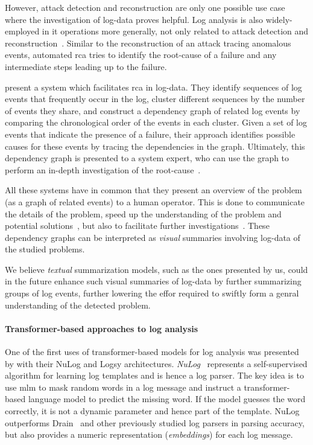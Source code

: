 However, attack detection and reconstruction are only one possible use case where the investigation of log-data proves helpful.
Log analysis is also widely-employed in \ac{it} operations more generally,
not only related to attack detection and reconstruction~\parencite{log_analysis}.
Similar to the reconstruction of an attack tracing anomalous events,
automated \ac{rca} tries to identify the root-cause of a failure and any intermediate steps leading up to the failure.

\citeauthor*{fes_cluster_logs} present a system which facilitates \ac{rca} in log-data.
They identify sequences of log events that frequently occur in the log,
cluster different sequences by the number of events they share,
and construct a dependency graph of related log events
by comparing the chronological order of the events in each cluster.
Given a set of log events that indicate the presence of a failure,
their approach identifies possible causes for these events by tracing the dependencies in the graph.
Ultimately, this dependency graph is presented to a system expert,
who can use the graph to perform an in-depth investigation of the root-cause~\parencite{fes_cluster_logs}.

All these systems have in common that they present an overview of the problem
(as a graph of related events) to a human operator.
This is done to communicate the details of the problem, speed up the understanding of the problem and potential solutions~\parencites{holmes}{hercule},
but also to facilitate further investigations~\parencite{fes_cluster_logs}.
These dependency graphs can be interpreted as \emph{visual} summaries involving log-data of the studied problems.

We believe \emph{textual} summarization models, such as the ones presented by us,
could in the future enhance such visual summaries of log-data by further summarizing groups of log events,
further lowering the effor required to swiftly form a genral understanding of the detected problem.

\paragraph{Transformer-based approaches to log analysis}

One of the first uses of transformer-based models for log analysis was presented by
\citeauthor{logsy} with their NuLog and Logsy architectures.
\emph{NuLog}~\parencite{nulog} represents a self-supervised algorithm for learning log templates and is hence a log parser.
The key idea is to use \ac{mlm} to mask random words in a log message and
instruct a transformer-based language model to predict the missing word.
If the model guesses the word correctly, it is not a dynamic parameter and hence part of the template.
NuLog outperforms Drain~\parencite{drain} and other previously studied log parsers in parsing accuracy,
but also provides a numeric representation (\emph{embeddings}) for each log message.

